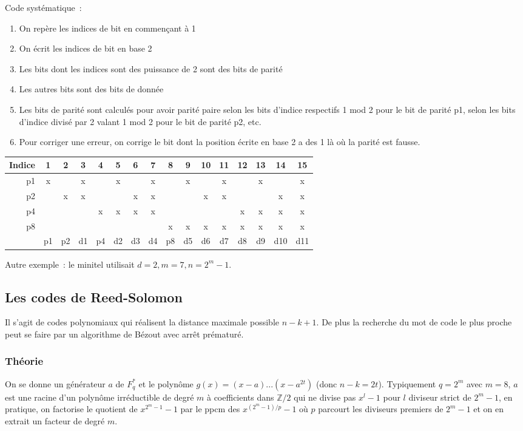 \documentclass[a4paper,11pt]{article}
\newcommand{\Z}{{\mathbb{Z}}}
\begin{document}
\begin{giacjshere}
Code syst\'ematique~: 
\begin{enumerate}
\item On rep\`ere les indices de bit en commen\c{c}ant
\`a 1
\item On \'ecrit les indices de bit en base 2
\item Les bits dont les indices sont des puissance de 2
sont des bits de parit\'e
\item Les autres bits sont des bits de donn\'ee
\item Les bits de parit\'e sont calcul\'es pour avoir parit\'e
paire selon les bits d'indice respectifs 1 mod 2 pour le bit de
parit\'e p1, selon les bits d'indice divis\'e par 2 valant 1 mod 2 pour le bit de parit\'e p2, etc.
\item Pour corriger une erreur, on corrige le bit dont la position
\'ecrite en base 2 a des 1 l\`a o\`u la parit\'e est fausse.
\end{enumerate}
\begin{tabular}{|r|ccccccccccccccc|} \hline 
Indice & 1 & 2 & 3 & 4 & 5 & 6 & 7 & 8 & 9 & 10 & 11 & 12 & 13 & 14 & 15 \\ \hline
p1     &  x &   & x &   & x  &    & x  &   & x &     &  x   &    & x  &  & x \\
p2     &     & x & x & &     & x  & x &    &    & x  & x    &   &    & x & x \\
p4     &     &    &    & x & x& x& x&      &    &     &       & x& x& x& x \\
p8      &    &    &    &    &    &   &  & x   & x & x  & x   & x & x & x & x \\
\hline 
& p1 & p2 & d1 & p4 & d2 & d3 & d4 & p8 & d5 & d6 & d7 & d8 & d9 & d10 & d11 \\
\hline 
\end{tabular}

Autre exemple~: le minitel utilisait $d=2, m=7, n=2^m-1$.

\subsection{Les codes de Reed-Solomon}
Il s'agit de codes polynomiaux qui r\'ealisent la distance maximale
possible $n-k+1$. De plus la recherche du mot de code le plus
proche peut se faire par un algorithme de B\'ezout avec arr\^et 
pr\'ematur\'e.

\subsubsection{Théorie}
On se donne un g\'en\'erateur $a$ 
de $F_q^*$ et le polyn\^ome $g(x)=(x-a)...(x-a^{2t})$ (donc $n-k=2t$). 
Typiquement $q=2^m$ avec $m=8$, 
$a$ est une racine d'un polyn\^ome irr\'eductible
de degr\'e $m$ à coefficients dans $\Z/2$ 
qui ne divise pas $x^l-1$ pour $l$ diviseur
strict de $2^m-1$, en pratique, on factorise le quotient de $x^{2^m-1}-1$
par le ppcm des $x^{(2^m-1)/p}-1$ o\`u $p$ parcourt les
diviseurs premiers de $2^m-1$ et on en extrait un facteur de degr\'e $m$.


\end{giacjshere}
\end{document}
